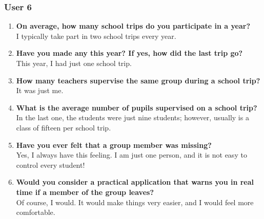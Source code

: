 \subsubsection*{User 6}
\begin{enumerate}
\item \textbf{On average, how many school trips do you participate in a year?}
\\ I typically take part in two school trips every year.
\item \textbf{Have you made any this year? If yes, how did the last trip go?}
\\ This year, I had just one school trip.
\item \textbf{How many teachers supervise the same group during a school trip?}
\\ It was just me.
\item \textbf{What is the average number of pupils supervised on a school trip?}
\\ In the last one, the students were just nine students; however, usually is a class of fifteen per school trip.
\item \textbf{Have you ever felt that a group member was missing?}
\\ Yes, I always have this feeling. I am just one person, and it is not easy to control every student!
\item \textbf{Would you consider a practical application that warns you in real time if a member of the group leaves?}
\\ Of course, I would. It would make things very easier, and I would feel more comfortable.
\end{enumerate}

